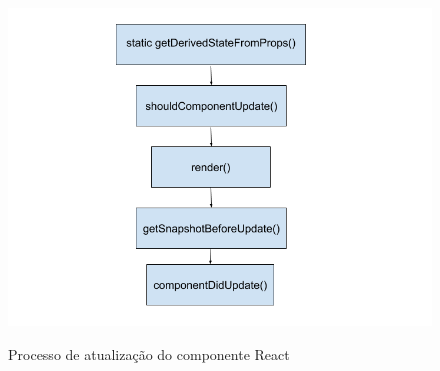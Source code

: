 \begin{figure}[H]
\centering
\caption{Processo de atualização do componente React}
\includegraphics[scale=0.7]{figuras/atualizacao.png}
\label{atualizacao}
\end{figure}
